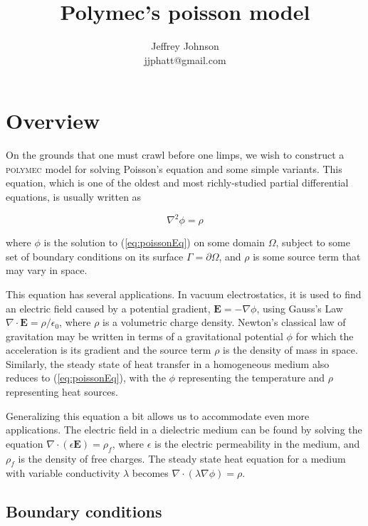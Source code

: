 \documentclass[12pt]{article}
\title{Polymec's poisson model}
\author{Jeffrey Johnson \\ 
jjphatt@gmail.com}
\newcommand{\labelSec}[1]{\label{sec:#1}}
\newcommand{\labelEq}[1]{\label{eq:#1}}
\newcommand{\refEq}[1]{(\ref{eq:#1})}
\newcommand{\polymec}{\textsc{polymec} }
\renewcommand{\vec}[1]{\mathbf{#1}}
\newcommand{\diverg}[1]{\nabla\cdot#1}
\newcommand{\grad}[1]{\nabla#1}
\newcommand{\laplacian}[1]{\nabla^2 #1}
\begin{document}
\maketitle

% 

\section{Overview}\labelSec{Overview}

On the grounds that one must crawl before one limps, we wish to construct a 
\polymec model for solving Poisson's equation and some simple variants. This 
equation, which is one of the oldest and most richly-studied partial differential 
equations, is usually written as

\begin{equation}
\laplacian{\phi} = \rho \labelEq{poissonEq}
\end{equation}

\noindent
where $\phi$ is the solution to \refEq{poissonEq} on some domain $\Omega$, 
subject to some set of boundary conditions on its surface $\Gamma = \partial\Omega$, 
and $\rho$ is some source term that may vary in space.

This equation has several applications. In vacuum electrostatics, it is used to find 
an electric field caused by a potential gradient, $\vec{E} = -\grad{\phi}$, 
using Gauss's Law $\diverg{\vec{E}} = \rho/\epsilon_0$, where $\rho$ is a volumetric 
charge density. Newton's classical law of gravitation may be written in terms of a 
gravitational potential $\phi$ for which the acceleration is its gradient and 
the source term $\rho$ is the density of mass in space. Similarly, the steady 
state of heat transfer in a homogeneous medium also reduces to \refEq{poissonEq}, 
with the $\phi$ representing the temperature and $\rho$ representing heat sources.

Generalizing this equation a bit allows us to accommodate even more applications. 
The electric field in a dielectric medium can be found by solving the equation 
$\diverg{(\epsilon \vec{E})} = \rho_{f}$, where $\epsilon$ is the electric 
permeability in the medium, and $\rho_{f}$ is the density of free charges. 
The steady state heat equation for a medium with variable conductivity $\lambda$ 
becomes $\diverg{(\lambda \grad{\phi})} = \rho$.

\subsection*{Boundary conditions}
\end{document}
